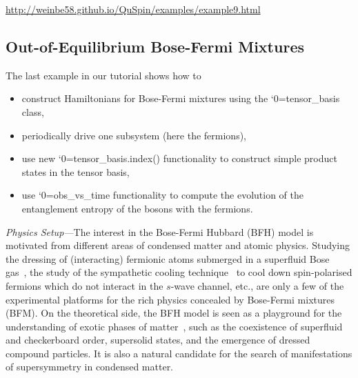\documentclass{SciPost}
\newcommand\0{\scalebox{-1}[1]{0}}
\let\svttfamily\ttfamily
\renewcommand\ttfamily{\svttfamily\catcode`0=\active }
\renewcommand\texttt{\bgroup\ttfamily\texttthelp}
\def\texttthelp#1{#1\egroup}
\begin{document}
\href{http://weinbe58.github.io/QuSpin/examples/example9.html}{http://weinbe58.github.io/QuSpin/examples/example9.html}\\




\subsection{Out-of-Equilibrium Bose-Fermi Mixtures}
\label{subsec:BF_mixtures}

The last example in our tutorial shows how to
\begin{itemize}
	\item construct Hamiltonians for Bose-Fermi mixtures using the \texttt{tensor\_basis} class,
	\item periodically drive one subsystem (here the fermions),
	\item use new \texttt{tensor\_basis.index()} functionality to construct simple product states in the tensor basis,
	\item use \texttt{obs\_vs\_time} functionality to compute the evolution of the entanglement entropy of the bosons with the fermions.
\end{itemize}

\noindent\emph{Physics Setup---}The interest in the Bose-Fermi Hubbard (BFH) model is motivated from different areas of condensed matter and atomic physics. Studying the dressing of (interacting) fermionic atoms submerged in a superfluid Bose gas~\cite{grusdt_15}, the study of the sympathetic cooling technique~\cite{ketterle_08} to cool down spin-polarised fermions which do not interact in the $s$-wave channel, etc., are only a few of the experimental platforms for the rich physics concealed by Bose-Fermi mixtures (BFM). On the theoretical side, the BFH model is seen as a playground for the understanding of exotic phases of matter~\cite{stasyuk_15,bilitewski_15,scaramazza_16,bukov_14_BFM}, such as the coexistence of superfluid and checkerboard order, supersolid states, and the emergence of dressed compound particles. It is also a natural candidate for the search of manifestations of supersymmetry in condensed matter.
\end{document}
